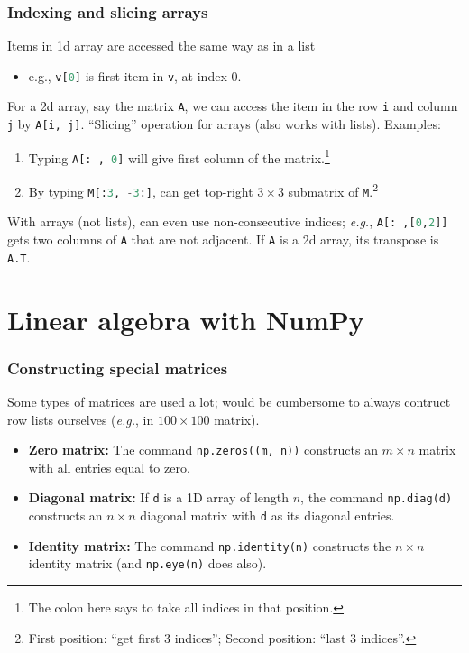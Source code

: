 \documentclass{beamer}
\theoremstyle{example}
\newcommand{\ct}[1]{\lstinline[language=Python,basicstyle=\ttfamily\footnotesize,stringstyle=\small\color{strings}]!#1!}
\begin{document}
\begin{frame}
\frametitle{Indexing and slicing arrays}
Items in 1d array are accessed the same way as in a list
\vspace*{-8pt}
\begin{itemize}
    \item[] e.g., \ct{v[0]} is first item in \ct{v}, at index 0.  
\end{itemize}

\vspace*{-6pt}
For a 2d array, say the matrix \ct{A}, we can access the item in the row \ct{i} and column \ct{j} by \ct{A[i, j]}. \newline
\pause
``Slicing'' operation for arrays (also works with lists). Examples:
\begin{enumerate}
    \item Typing \ct{A[: , 0]} will give first column of the matrix.\footnote{The colon here says to take all indices in that position.}
    \pause 
    \item By typing \ct{M[:3, -3:]}, can get top-right $3\times 3$ submatrix of \ct{M}.\footnote{First position: ``get first 3 indices''; Second position: ``last 3 indices''.}
\end{enumerate}

\pause
\vspace*{-6pt}
With arrays (not lists), can even use non-consecutive indices; \textit{e.g.}, \ct{A[: ,[0,2]]} gets two columns of \ct{A} that are not adjacent. \newline 
\pause
If \ct{A} is a 2d array, its transpose is \ct{A.T}. %
\vfill
\end{frame}

\section{Linear algebra with NumPy}

\begin{frame}[fragile]
\frametitle{Constructing special matrices}

Some types of matrices are used a lot; would be cumbersome to always contruct row lists ourselves (\textit{e.g.}, in $100\times100$ matrix).

\pause
\begin{itemize}
    \item[] \textbf{Zero matrix:} The command \ct{np.zeros((m, n))} constructs an $m\times n$ matrix with all entries equal to zero.
    \pause
    \item[] \textbf{Diagonal matrix:} If \ct{d} is a 1D array of length $n$, the command \ct{np.diag(d)} constructs an $n\times n$ diagonal matrix with \ct{d} as its diagonal entries.
    \pause
    \item[] \textbf{Identity matrix:} The command \ct{np.identity(n)} constructs the $n\times n$ identity matrix (and \ct{np.eye(n)} does also).
\end{itemize}

\end{frame}
\end{document}
